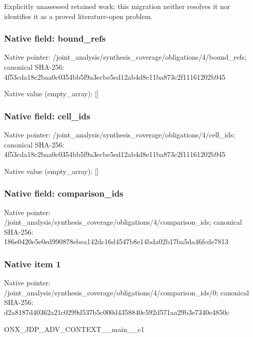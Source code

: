 \documentclass[10pt,a4paper]{article}
\begin{document}
\begingroup\raggedright\sloppy Explicitly unassessed retained work;\allowbreak{} this migration neither resolves it nor identifies it as a proved literature-open problem.\par\endgroup

\subsubsection{Native field: bound\_\allowbreak{}refs}
Native pointer: /joint\_\allowbreak{}analysis/synthesis\_\allowbreak{}coverage/obligations/4/bound\_\allowbreak{}refs; canonical SHA-256: 4f53cda18c2baa0c0354bb5f9a3ecbe5ed12ab4d8e11ba873c2f11161202b945

Native value (empty\_\allowbreak{}array): []

\subsubsection{Native field: cell\_\allowbreak{}ids}
Native pointer: /joint\_\allowbreak{}analysis/synthesis\_\allowbreak{}coverage/obligations/4/cell\_\allowbreak{}ids; canonical SHA-256: 4f53cda18c2baa0c0354bb5f9a3ecbe5ed12ab4d8e11ba873c2f11161202b945

Native value (empty\_\allowbreak{}array): []

\subsubsection{Native field: comparison\_\allowbreak{}ids}
Native pointer: /joint\_\allowbreak{}analysis/synthesis\_\allowbreak{}coverage/obligations/4/comparison\_\allowbreak{}ids; canonical SHA-256: 186e0420e5e0ed990878ebea142dc16d4547b8e14bda02b17ba5da46fcde7813

\subsubsection{Native item 1}
Native pointer: /joint\_\allowbreak{}analysis/synthesis\_\allowbreak{}coverage/obligations/4/comparison\_\allowbreak{}ids/0; canonical SHA-256: d2a8187d40362a21c0299d537b5c000d4358840c592d571aa29b3e7340e4850c

\begingroup\raggedright\sloppy ONX\_\allowbreak{}JDP\_\allowbreak{}ADV\_\allowbreak{}CONTEXT\_\allowbreak{}\_\allowbreak{}main\_\allowbreak{}\_\allowbreak{}c1\par\endgroup
\end{document}
